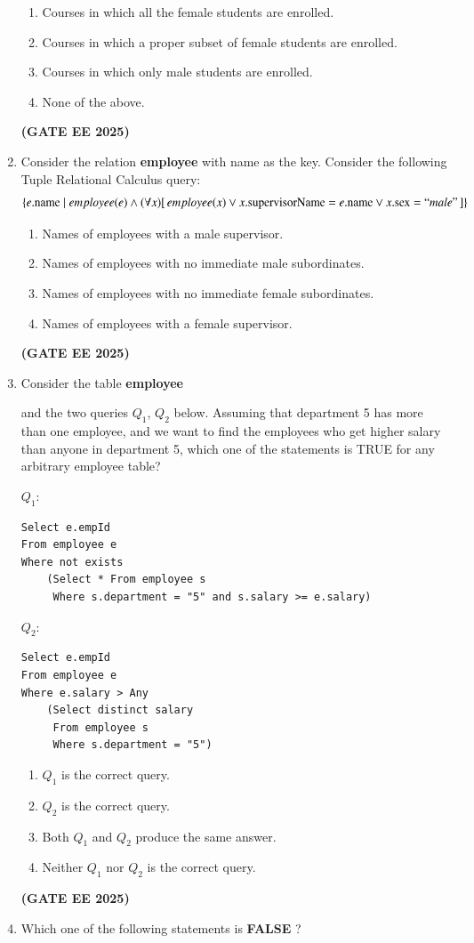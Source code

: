 \documentclass[journal,12pt,onecolumn]{IEEEtran}
\theoremstyle{remark}
\begin{document}
\begin{enumerate}
\begin{enumerate}
\item  Courses in which all the female students are enrolled. 
\item Courses in which a proper subset of female students are enrolled. 
\item Courses in which only male students are enrolled. 
\item None of the above.
\end{enumerate}
\hfill \textbf{(GATE EE 2025)}
\item Consider the relation 
\textbf{employee}
with name as the key. Consider the following Tuple Relational Calculus query:
\[
\{ e.\text{name} \mid employee(e) \wedge (\forall x) [\, employee(x) \vee x.\text{supervisorName} = e.\text{name} \vee x.\text{sex} = ``male" \,] \}
\]

\begin{enumerate}
\item Names of employees with a male supervisor. 
\item Names of employees with no immediate male subordinates. 
\item  Names of employees with no immediate female subordinates. 
\item Names of employees with a female supervisor.

\end{enumerate}
\hfill \textbf{(GATE EE 2025)}
\item Consider the table 
\textbf{employee}

and the two queries $Q_1$, $Q_2$ below. Assuming that department 5 has more than one employee, and we want to find the employees who get higher salary than anyone in department 5, which one of the statements is TRUE for any arbitrary employee table?


$Q_1$: 
\begin{verbatim}
Select e.empId
From employee e
Where not exists
    (Select * From employee s 
     Where s.department = "5" and s.salary >= e.salary)
\end{verbatim}


$Q_2$:
\begin{verbatim}
Select e.empId
From employee e
Where e.salary > Any
    (Select distinct salary 
     From employee s 
     Where s.department = "5")
\end{verbatim}

\begin{enumerate}
\item $Q_1$ is the correct query.
\item $Q_2$ is the correct query. 
\item  Both $Q_1$ and $Q_2$ produce the same answer. 
\item  Neither $Q_1$ nor $Q_2$ is the correct query.
\end{enumerate}
\hfill \textbf{(GATE EE 2025)}
\item  Which one of the following statements is \textbf{FALSE} ?


\end{enumerate}
\end{document}
